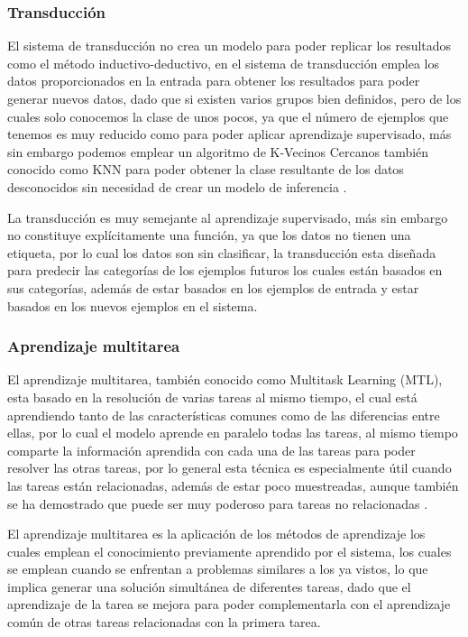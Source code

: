 \subsubsection{Transducción}

El sistema de transducción no crea un modelo para poder replicar los resultados como el método inductivo-deductivo, en el sistema de transducción emplea los datos proporcionados en la entrada para obtener los resultados para poder generar nuevos datos, dado que si existen varios grupos bien definidos, pero de los cuales solo conocemos la clase de unos pocos, ya que el número de ejemplos que tenemos es muy reducido como para poder aplicar aprendizaje supervisado, más sin embargo podemos emplear un algoritmo de K-Vecinos Cercanos también conocido como KNN para poder obtener la clase resultante de los datos desconocidos sin necesidad de crear un modelo de inferencia \cite{GarciaAlonso2021}.

La transducción es muy semejante al aprendizaje supervisado, más sin embargo no constituye explícitamente una función, ya que los datos no tienen una etiqueta, por lo cual los datos son sin clasificar, la transducción esta diseñada para predecir las categorías de los ejemplos futuros los cuales están basados en sus categorías, además de estar basados en los ejemplos de entrada y estar basados en los nuevos ejemplos en el sistema.

\subsubsection{Aprendizaje multitarea}

El aprendizaje multitarea, también conocido como Multitask Learning (MTL), esta basado en la resolución de varias tareas al mismo tiempo, el cual está aprendiendo tanto de las características comunes como de las diferencias entre ellas, por lo cual el modelo aprende en paralelo todas las tareas, al mismo tiempo comparte la información aprendida con cada una de las tareas para poder resolver las otras  tareas, por lo general esta técnica es especialmente útil cuando las tareas están relacionadas, además de estar poco muestreadas, aunque también se ha demostrado que puede ser muy poderoso para tareas no relacionadas \cite{CerdaMunoz2021Feb}.

El aprendizaje multitarea es la aplicación de los métodos de aprendizaje los cuales emplean el conocimiento previamente aprendido por el sistema, los cuales se emplean cuando se enfrentan a problemas similares a los ya vistos, lo que implica generar una solución simultánea de diferentes tareas, dado que el aprendizaje de la tarea se mejora para poder complementarla con el aprendizaje común de otras tareas relacionadas con la primera tarea.


